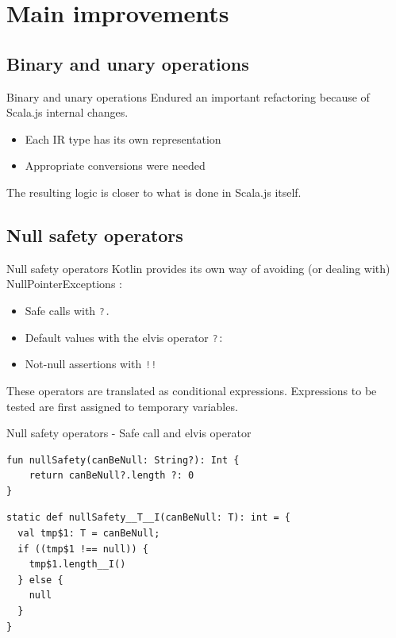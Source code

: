 \documentclass[10pt]{beamer}
\newcommand{\inlinecode}[2]{\colorbox{minted-bg}{\lstinline[language=#1]$#2$}}
\newcommand{\ktinline}[1]{\inlinecode{kotlin}{#1}}
\begin{document}
\section{Main improvements}


\subsection{Binary and unary operations}


\begin{frame}[fragile]{Binary and unary operations}
  Endured an important refactoring because of Scala.js internal changes.
  
  \begin{itemize}
   \item Each IR type has its own representation
   \item Appropriate conversions were needed
  \end{itemize}
  
  The resulting logic is closer to what is done in Scala.js itself.

\end{frame}

\subsection{Null safety operators}


\begin{frame}[fragile]{Null safety operators}
 Kotlin provides its own way of avoiding (or dealing with) NullPointerExceptions :
 
 \begin{itemize}
  \item Safe calls with \ktinline{?.}
  \item Default values with the elvis operator \ktinline{?:}
  \item Not-null assertions with \ktinline{!!}
 \end{itemize}

 These operators are translated as conditional expressions. Expressions to be tested are first assigned to temporary variables.
 
\end{frame}

\begin{frame}[fragile]{Null safety operators - Safe call and elvis operator}

\begin{verbatim}
fun nullSafety(canBeNull: String?): Int {
    return canBeNull?.length ?: 0
}
\end{verbatim}

 \begin{verbatim}
static def nullSafety__T__I(canBeNull: T): int = {
  val tmp$1: T = canBeNull;
  if ((tmp$1 !== null)) {
    tmp$1.length__I()
  } else {
    null
  }
}
 \end{verbatim}

\end{frame}
\end{document}
